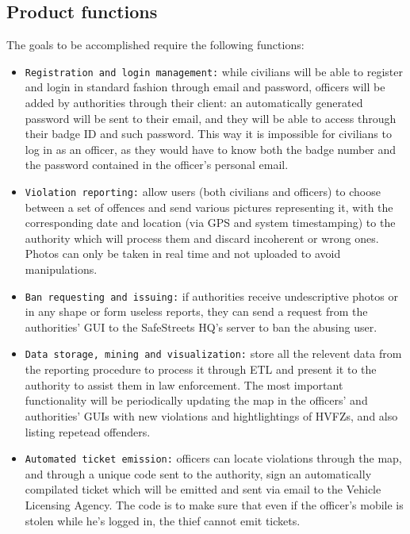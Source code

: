 \documentclass[12pt,a4paper]{article}
\begin{document}
\subsection{Product	functions}
The goals to be accomplished require the following functions:
 \begin{itemize}
\item \texttt{Registration and login management:} while civilians will be able to register and login in standard fashion through email and password, officers will be added by authorities through their client: an automatically generated password will be sent to their email, and they will be able to access through their badge ID and such password. This way it is impossible for civilians to log in as an officer, as they would have to know both the badge number and the password contained in the officer's personal email.
\item \texttt{Violation reporting:} allow users (both civilians and officers) to choose between a set of offences and send various pictures representing it, with the corresponding date and location (via GPS and system timestamping) to the authority which will process them and discard incoherent or wrong ones. Photos can only be taken in real time and not uploaded to avoid manipulations.
\item \texttt{Ban requesting and issuing:} if authorities receive undescriptive photos or in any shape or form useless reports, they can send a request from the authorities' GUI to the SafeStreets HQ's server to ban the abusing user.
\item  \texttt{Data storage, mining and visualization:} store all the relevent data from the reporting procedure to process it through ETL and present it to the authority to assist them in law enforcement. The most important functionality will be periodically updating the map in the officers' and authorities' GUIs with new violations and hightlightings of HVFZs, and also listing repetead offenders. 
\item  \texttt{Automated ticket emission:} officers can locate violations through the map, and through a unique code sent to the authority, sign an automatically compilated ticket which will be emitted and sent via email to the Vehicle Licensing Agency. The code is to make sure that even if the officer's mobile is stolen while he's logged in, the thief cannot emit tickets.
\end{itemize}
\end{document}
